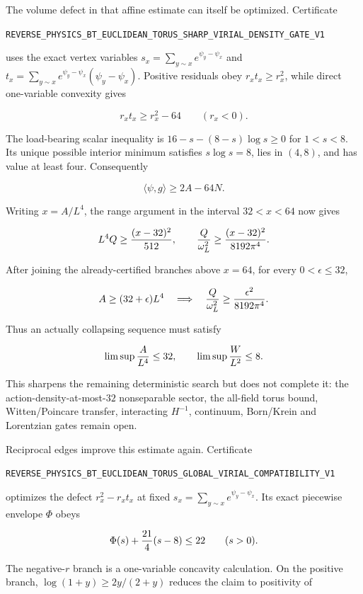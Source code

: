 \documentclass[11pt]{article}
\theoremstyle{definition}
\theoremstyle{remark}
\newcommand{\cert}[1]{\nolinkurl{#1}}
\begin{document}
The volume defect in that affine estimate can itself be optimized.
Certificate

\cert{REVERSE_PHYSICS_BT_EUCLIDEAN_TORUS_SHARP_VIRIAL_DENSITY_GATE_V1}

uses the exact vertex variables \(s_x=\sum_{y\sim x}e^{\psi_y-\psi_x}\)
and \(t_x=\sum_{y\sim x}e^{\psi_y-\psi_x}(\psi_y-\psi_x)\).  Positive
residuals obey \(r_xt_x\geq r_x^2\), while direct one-variable convexity
gives

\[
                         r_xt_x\geq r_x^2-64
                         \qquad(r_x<0).
\]

The load-bearing scalar inequality is
\(16-s-(8-s)\log s\geq0\) for \(1<s<8\).  Its unique possible interior
minimum satisfies \(s\log s=8\), lies in \((4,8)\), and has value at least
four.  Consequently

\[
                         \langle\psi,g\rangle\geq2A-64N.
\]

Writing \(x=A/L^4\), the range argument in the interval \(32<x<64\)
now gives

\[
 L^4Q\geq{(x-32)^2\over512},\qquad
 {Q\over\omega_L^2}\geq{(x-32)^2\over8192\pi^4}.
\]

After joining the already-certified branches above \(x=64\), for every
\(0<\epsilon\leq32\),

\[
 A\geq(32+\epsilon)L^4
 \quad\Longrightarrow\quad
 {Q\over\omega_L^2}\geq{\epsilon^2\over8192\pi^4}.
\]

Thus an actually collapsing sequence must satisfy

\[
 \limsup {A\over L^4}\leq32,
 \qquad
 \limsup {W\over L^2}\leq8.
\]

This sharpens the remaining deterministic search but does not complete it:
the action-density-at-most-\(32\) nonseparable sector, the all-field torus
bound, Witten/Poincare transfer, interacting \(H^{-1}\), continuum,
Born/Krein and Lorentzian gates remain open.

Reciprocal edges improve this estimate again.  Certificate

\cert{REVERSE_PHYSICS_BT_EUCLIDEAN_TORUS_GLOBAL_VIRIAL_COMPATIBILITY_V1}

optimizes the defect \(r_x^2-r_xt_x\) at fixed
\(s_x=\sum_{y\sim x}e^{\psi_y-\psi_x}\).  Its exact piecewise envelope
\(\Phi\) obeys

\[
                         \Phi(s)+{21\over4}(s-8)\leq22
                         \qquad(s>0).
\]

The negative-\(r\) branch is a one-variable concavity calculation.  On the
positive branch, \(\log(1+y)\geq2y/(2+y)\) reduces the claim to positivity
of
\end{document}

